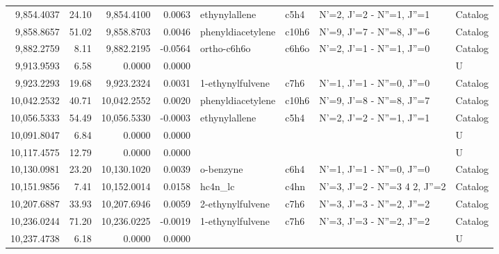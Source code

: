 \begin{longtable}{rrrrllll}
 9,854.4037 &     24.10 &        9,854.4100 &    0.0063 &               ethynylallene &    c5h4 &            N'=2, J'=2 - N''=1, J''=1 &    Catalog \\
 9,858.8657 &     51.02 &        9,858.8703 &    0.0046 &           phenyldiacetylene &   c10h6 &            N'=9, J'=7 - N''=8, J''=6 &    Catalog \\
 9,882.2759 &      8.11 &        9,882.2195 &   -0.0564 &                 ortho-c6h6o &   c6h6o &            N'=2, J'=1 - N''=1, J''=0 &    Catalog \\
 9,913.9593 &      6.58 &            0.0000 &    0.0000 &                             &         &                                      &          U \\
 9,923.2293 &     19.68 &        9,923.2324 &    0.0031 &            1-ethynylfulvene &    c7h6 &            N'=1, J'=1 - N''=0, J''=0 &    Catalog \\
10,042.2532 &     40.71 &       10,042.2552 &    0.0020 &           phenyldiacetylene &   c10h6 &            N'=9, J'=8 - N''=8, J''=7 &    Catalog \\
10,056.5333 &     54.49 &       10,056.5330 &   -0.0003 &               ethynylallene &    c5h4 &            N'=2, J'=2 - N''=1, J''=1 &    Catalog \\
10,091.8047 &      6.84 &            0.0000 &    0.0000 &                             &         &                                      &          U \\
10,117.4575 &     12.79 &            0.0000 &    0.0000 &                             &         &                                      &          U \\
10,130.0981 &     23.20 &       10,130.1020 &    0.0039 &                   o-benzyne &    c6h4 &            N'=1, J'=1 - N''=0, J''=0 &    Catalog \\
10,151.9856 &      7.41 &       10,152.0014 &    0.0158 &                     hc4n_lc &    c4hn &      N'=3, J'=2 - N''=3 4   2, J''=2 &    Catalog \\
10,207.6887 &     33.93 &       10,207.6946 &    0.0059 &            2-ethynylfulvene &    c7h6 &            N'=3, J'=3 - N''=2, J''=2 &    Catalog \\
10,236.0244 &     71.20 &       10,236.0225 &   -0.0019 &            1-ethynylfulvene &    c7h6 &            N'=3, J'=3 - N''=2, J''=2 &    Catalog \\
10,237.4738 &      6.18 &            0.0000 &    0.0000 &                             &         &                                      &          U \\

\end{longtable}
